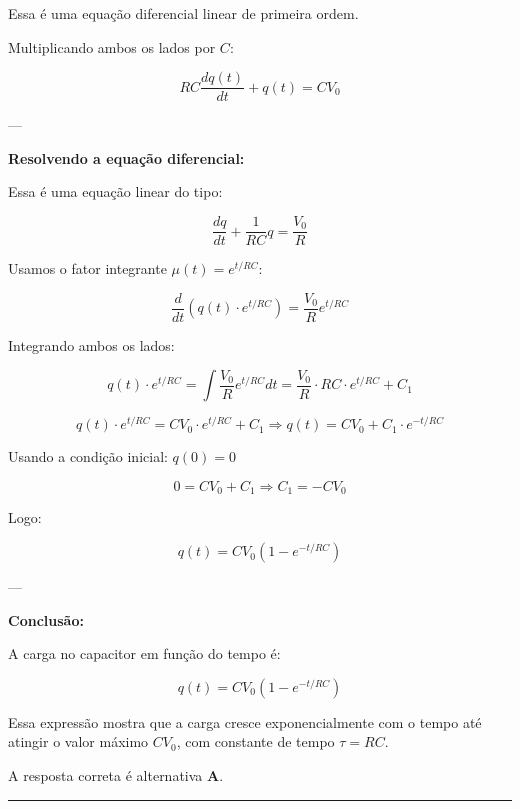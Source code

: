 \begin{flushleft}
Essa é uma equa\c{c}\~ao diferencial linear de primeira ordem.

Multiplicando ambos os lados por \( C \):

\[
RC \frac{dq(t)}{dt} + q(t) = CV_0
\]

---

\textbf{Resolvendo a equação diferencial:}

Essa é uma equação linear do tipo:

\[
\frac{dq}{dt} + \frac{1}{RC} q = \frac{V_0}{R}
\]

Usamos o fator integrante \( \mu(t) = e^{t/RC} \):

\[
\frac{d}{dt} \left( q(t) \cdot e^{t/RC} \right) = \frac{V_0}{R} e^{t/RC}
\]

Integrando ambos os lados:

\[
q(t) \cdot e^{t/RC} = \int \frac{V_0}{R} e^{t/RC} dt = \frac{V_0}{R} \cdot RC \cdot e^{t/RC} + C_1
\]

\[
q(t) \cdot e^{t/RC} = CV_0 \cdot e^{t/RC} + C_1
\Rightarrow q(t) = CV_0 + C_1 \cdot e^{-t/RC}
\]

Usando a condi\c{c}\~ao inicial: \( q(0) = 0 \)

\[
0 = CV_0 + C_1 \Rightarrow C_1 = -CV_0
\]

Logo:

\[
q(t) = CV_0 \left(1 - e^{-t/RC} \right)
\]

---

\textbf{Conclus\~ao:}

A carga no capacitor em fun\c{c}\~ao do tempo \'e:

\[
\boxed{q(t) = CV_0 \left(1 - e^{-t/RC} \right)}
\]

Essa expressão mostra que a carga cresce exponencialmente com o tempo até atingir o valor máximo \( CV_0 \), com constante de tempo \( \tau = RC \).

A resposta correta é alternativa \colorbox{green!50}{\textbf{A}}.
\end{flushleft}


\noindent\rule{\linewidth}{0.6pt}\\

